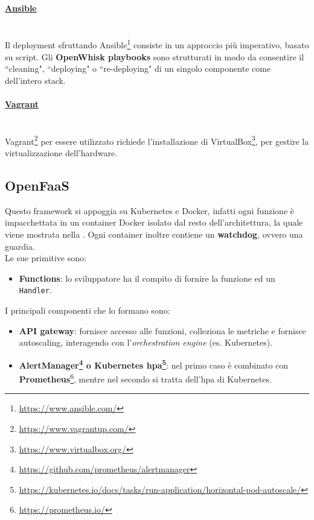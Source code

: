 \documentclass[12pt,a4paper,openany,twoside]{book}
\begin{document}
\paragraph{\underline{Ansible}} ~\\
Il deployment sfruttando Ansible\footnote{\url{https://www.ansible.com/}} consiste in un approccio più imperativo, basato su script. Gli \textbf{OpenWhisk playbooks} sono strutturati in modo da consentire il ``cleaning", ``deploying" o ``re-deploying" di un singolo componente come dell'intero stack.

\paragraph{\underline{Vagrant}} ~\\
Vagrant\footnote{\url{https://www.vagrantup.com/}} per essere utilizzato richiede l'installazione di VirtualBox\footnote{\url{https://www.virtualbox.org/}}, per gestire la virtualizzazione dell'hardware.

\subsection{OpenFaaS}

Questo framework si appoggia su Kubernetes e Docker, infatti ogni funzione è impacchettata in un container Docker isolato dal resto dell'architettura, la quale viene mostrata nella . Ogni container inoltre contiene un \textbf{watchdog}, ovvero una guardia.
\\
Le sue primitive sono:
\begin{itemize}
    \item \textbf{Functions}: lo sviluppatore ha il compito di fornire la funzione ed un \texttt{Handler}.
\end{itemize}

\noindent
I principali componenti che lo formano sono:
\begin{itemize}
    \item \textbf{API gateway}: fornisce accesso alle funzioni, colleziona le metriche e fornisce autoscaling, interagendo con l'\textit{orchestration engine} (es. Kubernetes).
    \item \textbf{AlertManager\footnote{\url{https://github.com/prometheus/alertmanager}} o Kubernetes \ac{hpa}\footnote{\url{https://kubernetes.io/docs/tasks/run-application/horizontal-pod-autoscale/}}}: nel primo caso è combinato con \textbf{Prometheus}\footnote{\url{https://prometheus.io/}}, mentre nel secondo si tratta dell'\ac{hpa} di Kubernetes. 
\end{itemize}
\end{document}
